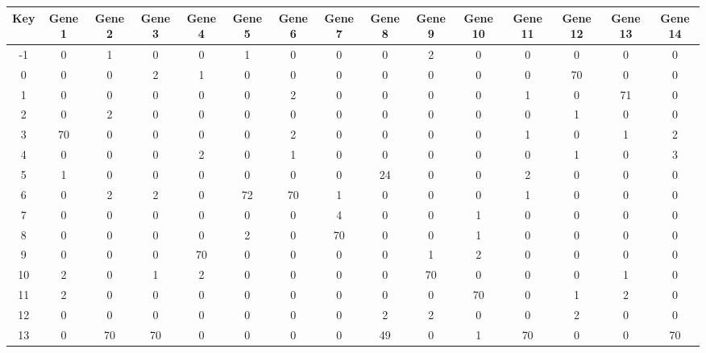 \begin{tabular}{|c|c|c|c|c|c|c|c|c|c|c|c|c|c|c|}
\hline
Key & Gene 1 & Gene 2 & Gene 3 & Gene 4 & Gene 5 & Gene 6 & Gene 7 & Gene 8 & Gene 9 & Gene 10 & Gene 11 & Gene 12 & Gene 13 & Gene 14 \\
\hline
-1 & 0 & 1 & 0 & 0 & 1 & 0 & 0 & 0 & 2 & 0 & 0 & 0 & 0 & 0 \\
0 & 0 & 0 & 2 & 1 & 0 & 0 & 0 & 0 & 0 & 0 & 0 & 70 & 0 & 0 \\
1 & 0 & 0 & 0 & 0 & 0 & 2 & 0 & 0 & 0 & 0 & 1 & 0 & 71 & 0 \\
2 & 0 & 2 & 0 & 0 & 0 & 0 & 0 & 0 & 0 & 0 & 0 & 1 & 0 & 0 \\
3 & 70 & 0 & 0 & 0 & 0 & 2 & 0 & 0 & 0 & 0 & 1 & 0 & 1 & 2 \\
4 & 0 & 0 & 0 & 2 & 0 & 1 & 0 & 0 & 0 & 0 & 0 & 1 & 0 & 3 \\
5 & 1 & 0 & 0 & 0 & 0 & 0 & 0 & 24 & 0 & 0 & 2 & 0 & 0 & 0 \\
6 & 0 & 2 & 2 & 0 & 72 & 70 & 1 & 0 & 0 & 0 & 1 & 0 & 0 & 0 \\
7 & 0 & 0 & 0 & 0 & 0 & 0 & 4 & 0 & 0 & 1 & 0 & 0 & 0 & 0 \\
8 & 0 & 0 & 0 & 0 & 2 & 0 & 70 & 0 & 0 & 1 & 0 & 0 & 0 & 0 \\
9 & 0 & 0 & 0 & 70 & 0 & 0 & 0 & 0 & 1 & 2 & 0 & 0 & 0 & 0 \\
10 & 2 & 0 & 1 & 2 & 0 & 0 & 0 & 0 & 70 & 0 & 0 & 0 & 1 & 0 \\
11 & 2 & 0 & 0 & 0 & 0 & 0 & 0 & 0 & 0 & 70 & 0 & 1 & 2 & 0 \\
12 & 0 & 0 & 0 & 0 & 0 & 0 & 0 & 2 & 2 & 0 & 0 & 2 & 0 & 0 \\
13 & 0 & 70 & 70 & 0 & 0 & 0 & 0 & 49 & 0 & 1 & 70 & 0 & 0 & 70 \\
\hline
\end{tabular}